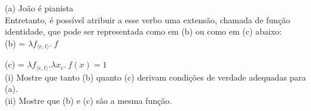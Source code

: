 \begin{tcolorbox}[parbox=false,boxrule=0pt,sharp corners,breakable]
\n (a) João é pianista\\

\n Entretanto, é possível atribuir a esse verbo uma extensão,
chamada de função identidade, que pode ser representada como em
(b) ou como em (c) abaixo:\\

\n (b)  = $\lambda f_{\langle e,t\rangle}.\ f $

\n (c)  = $\lambda f_{\langle e,t\rangle}.\lambda x_{e}.\
f(x)=1$\\

\n (i) Mostre que tanto (b) quanto (c) derivam condições de
verdade adequadas para (a).\\

\n (ii) Mostre que (b) e (c) são a mesma função.


\end{tcolorbox}













